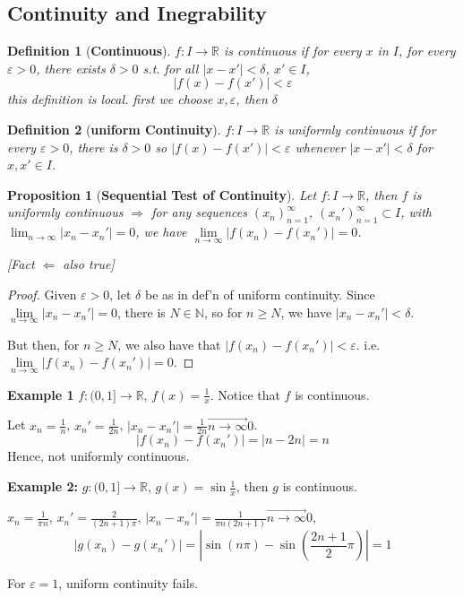 \documentclass[12pt]{article}
\theoremstyle{plain}
\newtheorem{definition}{Definition}[subsection]
\newtheorem{proposition}{Proposition}[subsection]
\newcommand{\abs}[1]{\left| #1 \right|}
\newcommand{\ep}{\varepsilon}
\newcommand{\dlim}{\displaystyle\lim\limits}
\begin{document}
	
	
	\subsection{Continuity and Inegrability}
	\begin{definition}[\textbf{Continuous}]
		$f: I \to \mathbb{R}$ is continuous if for every $x$ in $I$, for every
		$\ep>0$, there exists $\delta >0$ s.t. for all $\abs{x-x'}<\delta$, 
		$x'\in I$, 
		\[ 
			\abs{f(x) -f(x')} < \ep 
		\]
		this definition is local. first we choose $x, \ep$, then $\delta$
	\end{definition}

	\begin{definition}[\textbf{uniform Continuity}]
		$f: I \to \mathbb{R}$ is uniformly continuous if for every $\ep > 0$,
		there is $\delta > 0$ so $\abs{f(x)-f(x')}<\ep$ whenever 
		$\abs{x-x'}<\delta$ for $x, x' \in I$. 
	\end{definition}

	\begin{proposition}[\textbf{Sequential Test of Continuity}]
		Let $f:I\to \mathbb{R}$, then $f$ is uniformly continuous $\Rightarrow$
		for any sequences $(x_n)_{n=1}^{\infty}$, $(x_n')_{n=1}^{\infty} 
		\subset I$, with $\lim_{n\to \infty} \abs{x_n-x_n'} = 0$, 
		we have $\dlim_{n\to\infty} \abs{f(x_n)-f(x_n')} = 0$. 

		[Fact $\Leftarrow$ also true]
	\end{proposition}
	\begin{proof}
		Given $\ep > 0$, let $\delta$ be as in def'n of uniform continuity.
		Since $\dlim_{n\to\infty} \abs{x_n-x_n'} =0$, there is $N\in\mathbb{N}$,
		so for $n\geq N$, we have $\abs{x_n-x_n'}<\delta$. 

		But then, for $n\geq N$, we also have that $\abs{f(x_n)-f(x_n')}<\ep$.
		i.e. $\dlim_{n\to\infty} \abs{f(x_n)-f(x_n')} = 0$.
	\end{proof}

	{\color{Brown}
	\textbf{Example 1}
	$f: (0,1] \to \mathbb{R}$, $f(x) = \frac 1x$. Notice that $f$ is continuous.
	
	Let $x_n=\frac 1n$, $x_n'=\frac1{2n}$, 
	$\abs{x_n-x_n'}=\frac1{2n} \overset{\to}{n\to\infty} 0$.
	\[
		\abs{f(x_n)-f(x_n')} = \abs{n-2n} = n
	\]
	Hence, not uniformly continuous. 

	\textbf{Example 2:} $g:(0,1]\to\mathbb{R}$, $g(x) = \sin \frac 1x$, then
	$g$ is continuous. 

	$x_n = \frac 1{\pi n}$, $x_n'=\frac 2{(2n+1)\pi}$, 
	$\abs{x_n-x_n'}=\frac1{\pi n (2n+1)} \overset{\to}{n\to\infty} 0$, 
	\[
		\abs{g(x_n)-g(x_n')} = \abs{\sin(n\pi)-\sin(\frac{2n+1}2\pi)} = 1
	\]

	For $\ep = 1$, uniform continuity fails. 
	}
\end{document}
